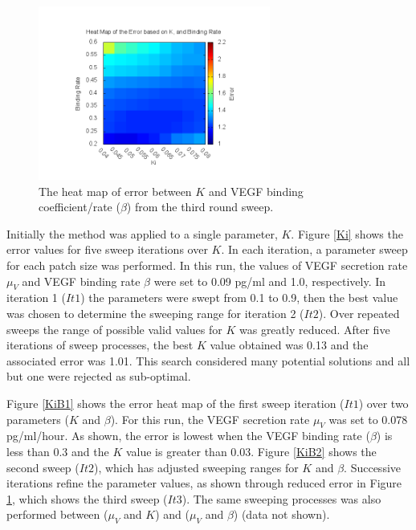 \begin{figure}[!t]
\centering
\includegraphics[width=3in]{./figures/Results/KiB3.png}

\caption{The heat map of error between $K$ and VEGF binding coefficient/rate ($\beta$) from the third round sweep.}
\label{KiB3}
\end{figure}


Initially the method was applied to a single parameter, $K$. Figure \ref{Ki} shows the error values for five sweep iterations over $K$. In each iteration, a parameter sweep for each patch size was performed. In this run, the values of VEGF secretion rate $\mu _{V}$ and VEGF binding rate $\beta$ were set to 0.09 pg/ml and 1.0, respectively. In iteration 1 ($It1$) the parameters were swept from 0.1 to 0.9, then the best value was chosen to determine the sweeping range for iteration 2 ($It2$). Over repeated sweeps the range of possible valid values for $K$ was greatly reduced. After five iterations of sweep processes, the best $K$ value obtained was 0.13 and the associated error was 1.01. This search considered many potential solutions and all but one were rejected as sub-optimal.

Figure \ref{KiB1} shows the error heat map of the first sweep iteration ($It1$) over two parameters ($K$ and $\beta$). For this run, the VEGF secretion rate $\mu _{V}$ was set to 0.078 pg/ml/hour. As shown, the error is lowest when the VEGF binding rate ($\beta$) is less than 0.3 and the $K$ value is greater than 0.03. Figure \ref{KiB2} shows the second sweep ($It2$), which has adjusted sweeping ranges for $K$ and $\beta$. Successive iterations refine the parameter values, as shown through reduced error in Figure \ref{KiB3}, which shows the third sweep ($It3$). The same sweeping processes was also performed between ($\mu _{V}$ and $K$) and ($\mu _{V}$ and $\beta$) (data not shown).


